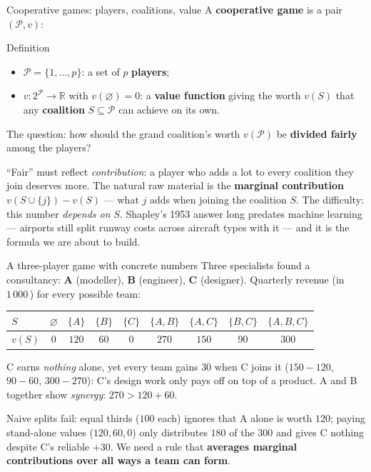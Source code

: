 \documentclass[aspectratio=169,11pt]{beamer}
\begin{document}
\begin{frame}{Cooperative games: players, coalitions, value}
  \scriptsize
  A \textbf{cooperative game} is a pair $(\mathcal{P}, v)$:
  \begin{block}{Definition}
    \begin{itemize}
      \item $\mathcal{P}=\{1,\dots,p\}$: a set of $p$ \textbf{players};
      \item $v : 2^{\mathcal{P}} \to \mathbb{R}$ with $v(\varnothing)=0$: a
            \textbf{value function} giving the worth $v(S)$ that any
            \textbf{coalition} $S\subseteq\mathcal{P}$ can achieve on its own.
    \end{itemize}
    The question: how should the grand coalition's worth $v(\mathcal{P})$ be
    \textbf{divided fairly} among the players?
  \end{block}
  \begin{readme}
    ``Fair'' must reflect \emph{contribution}: a player who adds a lot to every
    coalition they join deserves more. The natural raw material is the
    \textbf{marginal contribution} $v(S\cup\{j\})-v(S)$ --- what $j$ adds when
    joining the coalition $S$. The difficulty: this number \emph{depends on} $S$.
    Shapley's 1953 answer long predates machine learning --- airports still split runway
    costs across aircraft types with it --- and it is the formula we are about to build.
  \end{readme}
\end{frame}

\begin{frame}{A three-player game with concrete numbers}
  \footnotesize
  Three specialists found a consultancy: \textbf{A} (modeller), \textbf{B}
  (engineer), \textbf{C} (designer). Quarterly revenue (in $1\,000$\,\texteuro)
  for every possible team:
  \begin{numexample}
    \begin{center}
    \begin{tabular}{@{}lcccccccc@{}}
      \toprule
      $S$ & $\varnothing$ & $\{A\}$ & $\{B\}$ & $\{C\}$ & $\{A,B\}$ & $\{A,C\}$ & $\{B,C\}$ & $\{A,B,C\}$ \\
      \midrule
      $v(S)$ & $0$ & $120$ & $60$ & $0$ & $270$ & $150$ & $90$ & $300$ \\
      \bottomrule
    \end{tabular}
    \end{center}
    C earns \emph{nothing} alone, yet every team gains $30$ when C joins it
    ($150-120$, $90-60$, $300-270$): C's design work only pays off on top of a
    product. A and B together show \emph{synergy}: $270 > 120+60$.
  \end{numexample}
  \begin{takeaway}
    Naive splits fail: equal thirds ($100$ each) ignores that A alone is worth
    $120$; paying stand-alone values ($120,60,0$) only distributes $180$ of the
    $300$ and gives C nothing despite C's reliable $+30$. We need a rule that
    \textbf{averages marginal contributions over all ways a team can form}.
  \end{takeaway}
\end{frame}
\end{document}
